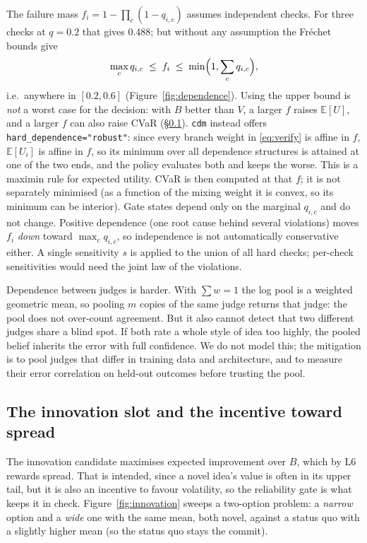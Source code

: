 \documentclass[11pt]{article}
\theoremstyle{definition}
\begin{document}
The failure mass $f_i=1-\prod_c(1-q_{i,c})$ assumes independent checks. For three checks at
$q=0.2$ that gives $0.488$; but without any assumption the Fr\'echet bounds give
\begin{equation}
\max_c q_{i,c}\;\le\; f_i \;\le\; \min\Bigl(1,\sum_c q_{i,c}\Bigr),
\end{equation}
i.e.\ anywhere in $[0.2,0.6]$ (Figure~\ref{fig:dependence}). Using the upper bound is \emph{not} a
worst case for the decision: with $B$ better than $V$, a larger $f$ raises $\mathbb E[U]$, and a
larger $f$ can also raise CVaR (\S\ref{sec:spread}). \texttt{cdm} instead offers
\texttt{hard\_dependence="robust"}: since every branch weight in \eqref{eq:verify} is affine in $f$,
$\mathbb E[U_i]$ is affine in $f$, so its minimum over all dependence structures is attained at one
of the two ends, and the policy evaluates both and keeps the worse. This is a maximin rule for
expected utility. CVaR is then computed at that $f$; it is not separately minimised (as a function of
the mixing weight it is convex, so its minimum can be interior). Gate states depend only on the
marginal $q_{i,c}$ and do not change. Positive dependence (one root cause behind several violations)
moves $f_i$ \emph{down} toward $\max_c q_{i,c}$, so independence is not automatically conservative
either. A single sensitivity $s$ is applied to the union of all hard checks; per-check
sensitivities would need the joint law of the violations.

Dependence between judges is harder. With $\sum w=1$ the log pool is a weighted geometric mean, so
pooling $m$ copies of the same judge returns that judge: the pool does not over-count agreement.
But it also cannot detect that two different judges share a blind spot. If both rate a whole style
of idea too highly, the pooled belief inherits the error with full confidence. We do not model
this; the mitigation is to pool judges that differ in training data and architecture, and to
measure their error correlation on held-out outcomes before trusting the pool.

\subsection{The innovation slot and the incentive toward spread}\label{sec:spread}

The innovation candidate maximises expected improvement over $B$, which by L6 rewards spread. That
is intended, since a novel idea's value is often in its upper tail, but it is also an incentive to
favour volatility, so the reliability gate is what keeps it in check. Figure~\ref{fig:innovation}
sweeps a two-option problem: a \emph{narrow} option and a \emph{wide} one with the same mean, both
novel, against a status quo with a slightly higher mean (so the status quo stays the commit).
\end{document}
